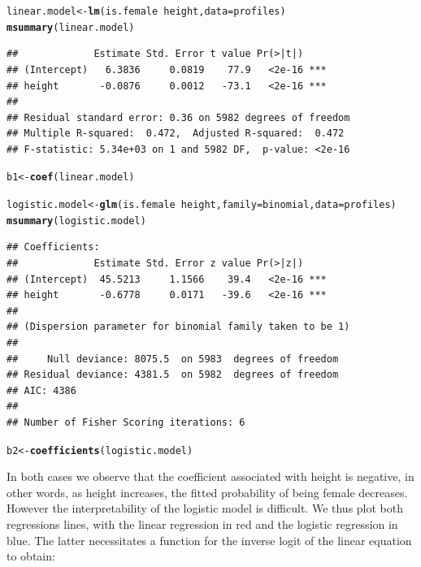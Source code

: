 \documentclass{article}\usepackage[]{graphicx}\usepackage[]{color}
\makeatletter
\newcommand{\hlopt}[1]{\textcolor[rgb]{0,0,0}{#1}}%
\newcommand{\hlstd}[1]{\textcolor[rgb]{0.345,0.345,0.345}{#1}}%
\newcommand{\hlkwb}[1]{\textcolor[rgb]{0.69,0.353,0.396}{#1}}%
\newcommand{\hlkwc}[1]{\textcolor[rgb]{0.333,0.667,0.333}{#1}}%
\newcommand{\hlkwd}[1]{\textcolor[rgb]{0.737,0.353,0.396}{\textbf{#1}}}%
\newenvironment{kframe}{%
 \def\at@end@of@kframe{}%
 \ifinner\ifhmode%
  \def\at@end@of@kframe{\end{minipage}}%
  \begin{minipage}{\columnwidth}%
 \fi\fi%
 \def\FrameCommand##1{\hskip\@totalleftmargin \hskip-\fboxsep
 \colorbox{shadecolor}{##1}\hskip-\fboxsep
     \hskip-\linewidth \hskip-\@totalleftmargin \hskip\columnwidth}%
 \MakeFramed {\advance\hsize-\width
   \@totalleftmargin\z@ \linewidth\hsize
   \@setminipage}}%
 {\par\unskip\endMakeFramed%
 \at@end@of@kframe}
\newenvironment{knitrout}{}{} %
\makeatother
\begin{document}
\begin{knitrout}
\color{fgcolor}\begin{kframe}
\begin{alltt}
\hlstd{linear.model} \hlkwb{<-} \hlkwd{lm}\hlstd{(is.female} \hlopt{~} \hlstd{height,} \hlkwc{data}\hlstd{=profiles)}
\hlkwd{msummary}\hlstd{(linear.model)}
\end{alltt}
\begin{verbatim}
##             Estimate Std. Error t value Pr(>|t|)    
## (Intercept)   6.3836     0.0819    77.9   <2e-16 ***
## height       -0.0876     0.0012   -73.1   <2e-16 ***
## 
## Residual standard error: 0.36 on 5982 degrees of freedom
## Multiple R-squared:  0.472,	Adjusted R-squared:  0.472 
## F-statistic: 5.34e+03 on 1 and 5982 DF,  p-value: <2e-16
\end{verbatim}
\begin{alltt}
\hlstd{b1} \hlkwb{<-} \hlkwd{coef}\hlstd{(linear.model)}
\end{alltt}
\end{kframe}
\end{knitrout}

\begin{knitrout}
\color{fgcolor}\begin{kframe}
\begin{alltt}
\hlstd{logistic.model} \hlkwb{<-} \hlkwd{glm}\hlstd{(is.female} \hlopt{~} \hlstd{height,} \hlkwc{family}\hlstd{=binomial,} \hlkwc{data}\hlstd{=profiles)}
\hlkwd{msummary}\hlstd{(logistic.model)}
\end{alltt}
\begin{verbatim}
## Coefficients:
##             Estimate Std. Error z value Pr(>|z|)    
## (Intercept)  45.5213     1.1566    39.4   <2e-16 ***
## height       -0.6778     0.0171   -39.6   <2e-16 ***
## 
## (Dispersion parameter for binomial family taken to be 1)
## 
##     Null deviance: 8075.5  on 5983  degrees of freedom
## Residual deviance: 4381.5  on 5982  degrees of freedom
## AIC: 4386
## 
## Number of Fisher Scoring iterations: 6
\end{verbatim}
\begin{alltt}
\hlstd{b2} \hlkwb{<-} \hlkwd{coefficients}\hlstd{(logistic.model)}
\end{alltt}
\end{kframe}
\end{knitrout}

In both cases we observe that the coefficient associated with height is negative, in other words, as height increases, the fitted probability of being female decreases.  However the interpretability of the logistic model is difficult.  We thus plot both regressions lines, with the linear regression in red and the logistic regression in blue.  The latter necessitates a function for the inverse logit of the linear equation to obtain:
\end{document}
